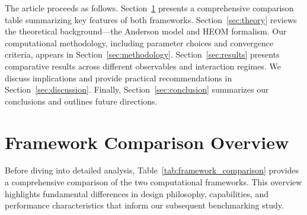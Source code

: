 \documentclass[preprint,1p]{elsarticle}
\begin{document}
The article proceeds as follows. Section~\ref{sec:comparison_table} presents a comprehensive comparison table summarizing key features of both frameworks. Section~\ref{sec:theory} reviews the theoretical background—the Anderson model and HEOM formalism. Our computational methodology, including parameter choices and convergence criteria, appears in Section~\ref{sec:methodology}. Section~\ref{sec:results} presents comparative results across different observables and interaction regimes. We discuss implications and provide practical recommendations in Section~\ref{sec:discussion}. Finally, Section~\ref{sec:conclusion} summarizes our conclusions and outlines future directions.

\section{Framework Comparison Overview}
\label{sec:comparison_table}

Before diving into detailed analysis, Table~\ref{tab:framework_comparison} provides a comprehensive comparison of the two computational frameworks. This overview highlights fundamental differences in design philosophy, capabilities, and performance characteristics that inform our subsequent benchmarking study.
\end{document}
